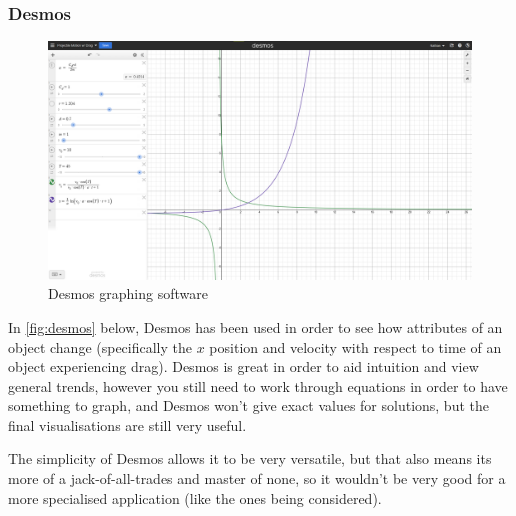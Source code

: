 \documentclass[tikz, 11pt]{article}
\begin{document}
            \subsubsection{Desmos}
                \begin{figure}[!ht]
                    \begin{center}
                        \includegraphics[width=.5\textwidth]{figures/desmos.png}
                    \end{center}
                    \caption{Desmos graphing software}
                    \label{fig:desmos}
                \end{figure}

                In \autoref{fig:desmos} below, Desmos has been used in order to see how attributes of an object change (specifically the $x$ position and velocity with respect to time of an object experiencing drag). Desmos is great in order to aid intuition and view general trends, however you still need to work through equations in order to have something to graph, and Desmos won't give exact values for solutions, but the final visualisations are still very useful. 

                The simplicity of Desmos allows it to be very versatile, but that also means its more of a jack-of-all-trades and master of none, so it wouldn't be very good for a more specialised application (like the ones being considered).
\end{document}
